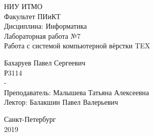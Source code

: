 \begin{center}
НИУ ИТМО \\
\vspace{1cm}
Факультет ПИиКТ \\
Дисциплина: Информатика \\ \vspace{5cm}
Лабораторная работа №7 \\
Работа с системой компьютерной вёрстки TEX \vspace{5cm}
\end{center}
\begin{flushright}
Бахаруев Павел Сергеевич\\
Р3114 \\
-\\
Преподаватель: Малышева Татьяна Алексеевна \\
Лектор: Балакшин Павел Валерьевич \\
\end{flushright}
\null\vfill
\begin{center}
Санкт-Петербург \\ 
2019
\end{center}
